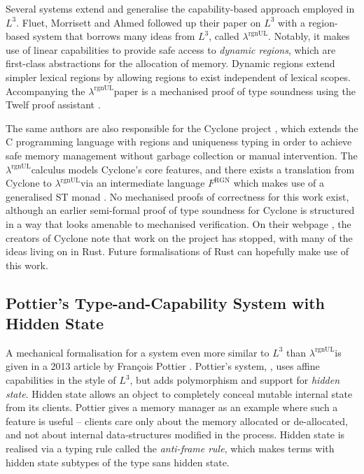\documentclass[]{unswthesis}
\newcommand{\rgnUL}{$\lambda^\text{rgnUL}$\text{ }}
\newcommand{\SSPHS}{\text{SSPHS }}
\newcommand{\Francois}{Fran\frenchc{c}ois }
\let\frenchc\c
\let\c\texttt
\let\i\textit
\begin{document}
Several systems extend and generalise the capability-based approach employed in $L^3$. Fluet, Morrisett and Ahmed followed up their paper on $L^3$ with a region-based system that borrows many ideas from $L^3$, called \rgnUL \cite{fluet06}. Notably, it makes use of linear capabilities to provide safe access to \i{dynamic regions}, which are first-class abstractions for the allocation of memory. Dynamic regions extend simpler lexical regions by allowing regions to exist independent of lexical scopes. Accompanying the \rgnUL paper is a mechanised proof of type soundness using the Twelf proof assistant \cite{pfenning99}.

The same authors are also responsible for the Cyclone project \cite{grossman05}, which extends the C programming language with regions and uniqueness typing in order to achieve safe memory management without garbage collection or manual intervention. The \rgnUL calculus models Cyclone's core features, and there exists a translation from Cyclone to \rgnUL via an intermediate language $F^\text{RGN}$ which makes use of a generalised ST monad \cite{fluet06, fluet04}. No mechanised proofs of correctness for this work exist, although an earlier semi-formal proof of type soundness for Cyclone \cite{jim01} is structured in a way that looks amenable to mechanised verification. On their webpage \cite{cycloneWeb}, the creators of Cyclone note that work on the project has stopped, with many of the ideas living on in Rust. Future formalisations of Rust can hopefully make use of this work.

\subsection{Pottier's Type-and-Capability System with Hidden State}
\label{sec:ssphs}

A mechanical formalisation for a system even more similar to $L^3$ than \rgnUL is given in a 2013 article by \Francois Pottier \cite{pottier13}. Pottier's system, \SSPHS, uses affine capabilities in the style of $L^3$, but adds polymorphism and support for \i{hidden state}. Hidden state allows an object to completely conceal mutable internal state from its clients. Pottier gives a memory manager as an example where such a feature is useful -- clients care only about the memory allocated or de-allocated, and not about internal data-structures modified in the process. Hidden state is realised via a typing rule called the \i{anti-frame rule}, which makes terms with hidden state subtypes of the type sans hidden state.
\end{document}

